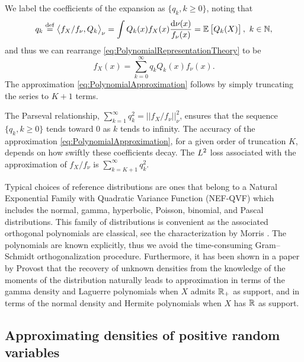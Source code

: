 We label the coefficients of the expansion as $\{q_{k},k \geq 0\}$, noting that
\begin{equation}
q_k\overset{\mathrm{def}}{=} \left<f_{X}/f_{\nu} , Q_{k}\right>_\nu =\int Q_{k}(x)f_{X}(x)\frac{\mathrm{d} \nu(x)}{f_\nu(x)} =\mathbb E\left[Q_{k}(X)\right], \text{ }k\in \mathbb N,\nonumber
\end{equation}
and thus we can rearrange \eqref{eq:PolynomialRepresentationTheory} to be
\begin{equation}\label{eq:PolynomialRepresentation}
f_{X}(x)=\sum_{k=0}^{\infty} q_k Q_{k}(x) f_{\nu}(x).
\end{equation}
The approximation \eqref{eq:PolynomialApproximation} follows by simply truncating the series to $K+1$ terms.

The Parseval relationship, $\sum_{k=1}^{\infty}q_{k}^{2}=||f_{X}/f_{\nu}||_\nu^{2}$, ensures that the sequence $\{q_{k},k \geq 0\}$ tends toward $0$ as $k$ tends to infinity. The accuracy of the approximation \eqref{eq:PolynomialApproximation}, for a given order of truncation $K$, depends on how swiftly these coefficients decay. The $L^2$ loss associated with the approximation of $f_{X}/f_{\nu}$ is $\sum_{k=K+1}^{\infty}q_{k}^{2}$.

Typical choices of reference distributions are ones that belong to a Natural Exponential Family with Quadratic Variance Function (NEF-QVF) which includes the normal, gamma, hyperbolic, Poisson, binomial, and Pascal distributions.
This family of distributions is convenient as the associated orthogonal polynomials are classical, see the characterization by Morris \cite{Mo82}. The polynomials are known explicitly, thus we avoid the time-consuming Gram--Schmidt orthogonalization procedure. Furthermore, it has been shown in a paper by Provost \cite{Pr05} that the recovery of unknown densities from the knowledge of the moments of the distribution naturally leads to approximation in terms of the gamma density and Laguerre polynomials when $X$ admits $\mathbb{R}_{+}$ as support, and in terms of the normal density and Hermite polynomials when $X$ has $\mathbb{R}$ as support.

\subsection{Approximating densities of positive random variables} \label{ssec:PolynomialApproxPositive}

